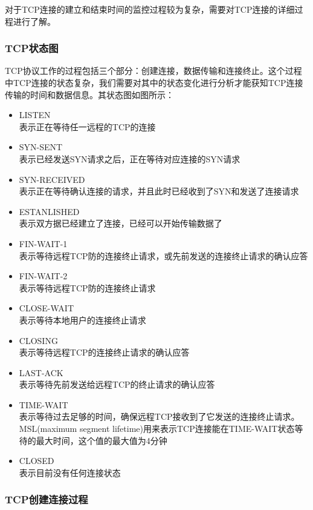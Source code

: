 \documentclass[format=final, language=chinese, degree=fyp]{hustthesis}
\begin{document}
对于TCP连接的建立和结束时间的监控过程较为复杂，需要对TCP连接的详细过程进行了解。

\subsubsection{TCP状态图}

TCP协议工作的过程包括三个部分：创建连接，数据传输和连接终止。这个过程中TCP连接的状态复杂，我们需要对其中的状态变化进行分析才能获知TCP连接传输的时间和数据信息。其状态图如图所示：



\begin{itemize}
	\item LISTEN \\
 表示正在等待任一远程的TCP的连接
	\item SYN-SENT \\
 表示已经发送SYN请求之后，正在等待对应连接的SYN请求
	\item SYN-RECEIVED \\
 表示正在等待确认连接的请求，并且此时已经收到了SYN和发送了连接请求
	\item ESTANLISHED \\
 表示双方据已经建立了连接，已经可以开始传输数据了
	\item FIN-WAIT-1 \\
 表示等待远程TCP防的连接终止请求，或先前发送的连接终止请求的确认应答
	\item FIN-WAIT-2 \\
 表示等待远程TCP防的连接终止请求
	\item CLOSE-WAIT \\
 表示等待本地用户的连接终止请求
	\item CLOSING \\
 表示等待远程TCP的连接终止请求的确认应答
	\item LAST-ACK \\
 表示等待先前发送给远程TCP的终止请求的确认应答
	\item TIME-WAIT \\
 表示等待过去足够的时间，确保远程TCP接收到了它发送的连接终止请求。MSL(maximum segment lifetime)用来表示TCP连接能在TIME-WAIT状态等待的最大时间，这个值的最大值为4分钟
	\item CLOSED \\
  表示目前没有任何连接状态
\end{itemize}

\subsubsection{TCP创建连接过程}
\end{document}
